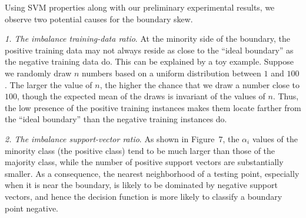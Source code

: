 %
%

Using SVM properties along with our preliminary
experimental results,
we observe two potential causes for the boundary skew.
\begin{nlist}
\item {\em 1. The imbalance training-data ratio}.
At the minority side of the boundary, the positive 
training data may not always reside as close to the ``ideal
boundary'' as the negative training data do.  
This can be explained by a toy example.
Suppose we randomly draw $n$ numbers based on 
a uniform distribution between $1$ and $100$.
The larger the value of $n$, the higher the
chance that we draw a number close to $100$,
though the expected mean of the draws is invariant of
the values of $n$.  Thus, the low presence of
the positive training instances makes them locate
farther from the ``ideal boundary'' than 
the negative training instances do.

\item {\em 2. The imbalance support-vector ratio}.
As shown in Figure~$7$, the $\alpha_i$ values of
the minority class (the positive class)
tend to be much larger than those
of the majority class, while the number of positive
support vectors are substantially smaller.  
As a consequence, the nearest
neighborhood of a testing point, especially
when it is near the boundary, is 
likely to be dominated by negative support vectors,
and hence the decision function is
more likely to classify a boundary point negative.
\end{nlist}

